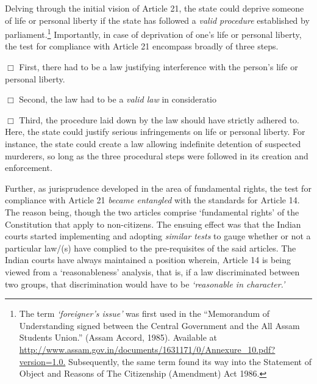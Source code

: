 \begin{multicols}{2}
\noi
Delving through the initial vision of Article 21, the state could deprive someone of life or
personal liberty if the state has followed a \textit{valid procedure} established by
parliament.\footnote{The term \textit{‘foreigner’s issue’} was first used in the “Memorandum of Understanding signed between the Central Government and the All Assam Students Union.” (Assam Accord, 1985). Available at\\ \url{http://www.assam.gov.in/documents/1631171/0/Annexure_10.pdf?version=1.0.} Subsequently, the same term
found its way into the Statement of Object and Reasons of The Citizenship (Amendment) Act 1986.} Importantly, in case of deprivation of one's life or personal liberty, the test for
compliance with Article 21 encompass broadly of three steps.

\vspace{-.1cm}

\noi
$\Box$ First, there had to be a law justifying interference with the person's life or personal liberty.

\vspace{-.1cm}

\noi
$\Box$ Second, the law had to be a \textit{valid law} in consideratio

\vspace{-.1cm}

\noi
$\Box$  Third, the procedure laid down by the law should have strictly adhered to. Here, the state
could justify serious infringements on life or personal liberty. For instance, the state could
create a law allowing indefinite detention of suspected murderers, so long as the three
procedural steps were followed in its creation and enforcement.

\vspace{-.1cm}

\noi
Further, as jurisprudence developed in the area of fundamental rights, the test for compliance
with Article 21 \textit{became entangled} with the standards for Article 14. The reason being, though
the two articles comprise ‘fundamental rights’ of the Constitution that apply to non-citizens.
The ensuing effect was that the Indian courts started implementing and adopting \textit{similar tests}
to gauge whether or not a particular law/(s) have complied to the pre-requisites of the said
articles. The Indian courts have always maintained a position wherein, Article 14 is being
viewed from a ‘reasonableness’ analysis, that is, if a law discriminated between two groups,
that discrimination would have to be \textit{‘reasonable in character.’}


\end{multicols}
